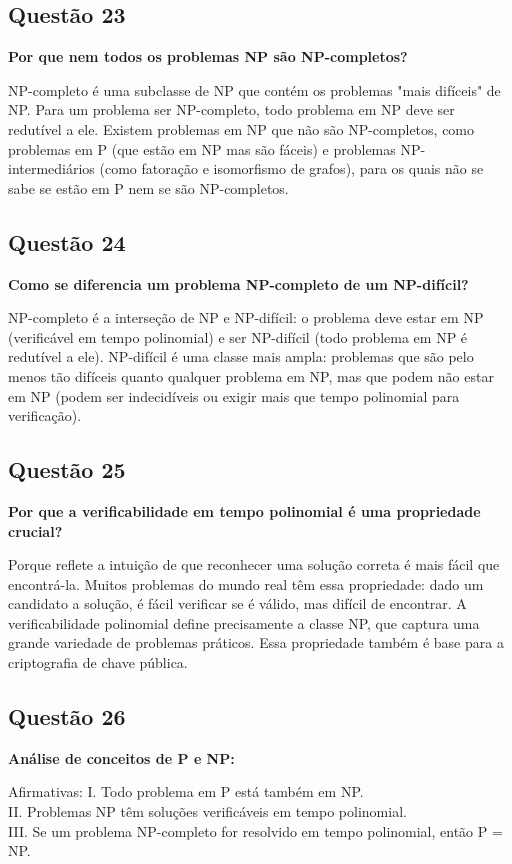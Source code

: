 \documentclass[conference]{IEEEtran}
\begin{document}
\subsection{Questão 23}
\textbf{Por que nem todos os problemas NP são NP-completos?}

NP-completo é uma subclasse de NP que contém os problemas "mais difíceis" de NP. Para um problema ser NP-completo, todo problema em NP deve ser redutível a ele. Existem problemas em NP que não são NP-completos, como problemas em P (que estão em NP mas são fáceis) e problemas NP-intermediários (como fatoração e isomorfismo de grafos), para os quais não se sabe se estão em P nem se são NP-completos.

\subsection{Questão 24}
\textbf{Como se diferencia um problema NP-completo de um NP-difícil?}

NP-completo é a interseção de NP e NP-difícil: o problema deve estar em NP (verificável em tempo polinomial) e ser NP-difícil (todo problema em NP é redutível a ele). NP-difícil é uma classe mais ampla: problemas que são pelo menos tão difíceis quanto qualquer problema em NP, mas que podem não estar em NP (podem ser indecidíveis ou exigir mais que tempo polinomial para verificação).

\subsection{Questão 25}
\textbf{Por que a verificabilidade em tempo polinomial é uma propriedade crucial?}

Porque reflete a intuição de que reconhecer uma solução correta é mais fácil que encontrá-la. Muitos problemas do mundo real têm essa propriedade: dado um candidato a solução, é fácil verificar se é válido, mas difícil de encontrar. A verificabilidade polinomial define precisamente a classe NP, que captura uma grande variedade de problemas práticos. Essa propriedade também é base para a criptografia de chave pública.

\subsection{Questão 26}
\textbf{Análise de conceitos de P e NP:}

Afirmativas:
I. Todo problema em P está também em NP. \\
II. Problemas NP têm soluções verificáveis em tempo polinomial. \\
III. Se um problema NP-completo for resolvido em tempo polinomial, então P = NP.
\end{document}

